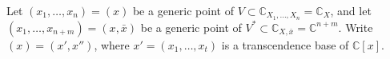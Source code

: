 Let $(x_1, \ldots, x_n) = (x)$ be a generic point of $V \subset \mathbb{C}_{X_1, \ldots, X_n} = \mathbb{C}_X$, and let $(x_1, \ldots, x_{n+m}) = (x, \bar{x})$ be a generic point of $V^* \subset \mathbb{C}_{X, \bar{x}} = \mathbb{C}^{n+m}$. Write $(x) = (x', x'')$, where $x' = (x_1, \ldots, x_t)$ is a transcendence base of $\mathbb{C}[x]$.
